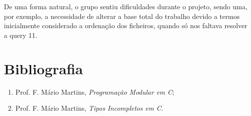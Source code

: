 \documentclass[a4paper]{article}
\begin{document}
De uma forma natural, o grupo sentiu dificuldades durante o projeto, sendo 
uma, por exemplo, a necessidade de alterar a base total do trabalho devido
a termos inicialmente considerado a ordenação dos ficheiros, quando só nos
faltava resolver a query 11.

\section{Bibliografia}

\begin{enumerate} 
	\item Prof. F. Mário Martins, \textit{Programação Modular em C};
	\item Prof. F. Mário Martins, \textit{Tipos Incompletos em C}.
\end{enumerate}
\end{document}
